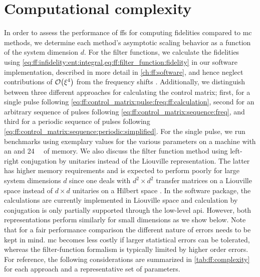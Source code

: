 \section{Computational complexity}\label{sec:ff:performance:complexity}
In order to assess the performance of \glspl{ff} for computing fidelities compared to \gls{mc} methods, we determine each method's asymptotic scaling behavior as a function of the system dimension $d$.
For the filter functions, we calculate the fidelities using \cref{eq:ff:infidelity:ent:integral,eq:ff:filter_function:fidelity} in our software implementation, described in more detail in \cref{ch:ff:software}, and hence neglect contributions of $\order{\xi^4}$ from the frequency shifts \freqshifts.
Additionally, we distinguish between three different approaches for calculating the control matrix; first, for a single pulse following \cref{eq:ff:control_matrix:pulse:freq:ff:calculation}, second for an arbitrary sequence of pulses following \cref{eq:ff:control_matrix:sequence:freq}, and third for a periodic sequence of pulses following \cref{eq:ff:control_matrix:sequence:periodic:simplified}.
For the single pulse, we run benchmarks using exemplary values for the various parameters on a machine with an \slowprocessor and \qty{24}{\giga\byte} of memory.
We also discuss the filter function method using left-right conjugation by unitaries instead of the Liouville representation.
The latter has higher memory requirements and is expected to perform poorly for large system dimensions $d$ since one deals with $d^2\times d^2$ transfer matrices on a Liouville space \Lspace instead of $d\times d$ unitaries on a Hilbert space \Hspace.
In the software package, the calculations are currently implemented in Liouville space and calculation by conjugation is only partially supported through the low-level \gls{api}.
However, both representations perform similarly for small dimensions as we show below.
Note that for a fair performance comparison the different nature of errors needs to be kept in mind.
\Gls{mc} becomes less costly if larger statistical errors can be tolerated, whereas the filter-function formalism is typically limited by higher order errors.
For reference, the following considerations are summarized in \cref{tab:ff:complexity} for each approach and a representative set of parameters.


